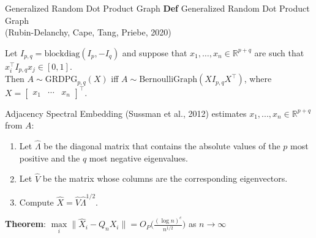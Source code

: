 \documentclass[
  ignorenonframetext,
]{beamer}
\providecommand{\tightlist}{%
  \setlength{\itemsep}{0pt}\setlength{\parskip}{0pt}}
\begin{document}
\begin{frame}{Generalized Random Dot Product Graph}
\protect\hypertarget{generalized-random-dot-product-graph}{}
\textbf{Def} Generalized Random Dot Product Graph\\
(Rubin-Delanchy, Cape, Tang, Priebe, 2020)

Let \(I_{p,q} = \text{blockdiag}(I_p, -I_q)\) and suppose that
\(x_1, \ldots, x_n \in \mathbb{R}^{p+q}\) are such that
\(x_i^\top I_{p,q} x_j \in [0,1]\).\\
Then \(A \sim \text{GRDPG}_{p, q}(X)\) iff
\(A \sim \text{BernoulliGraph}(X I_{p,q} X^\top)\), where
\(X = \begin{bmatrix} x_1 & \cdots & x_n \end{bmatrix}^\top\).

Adjacency Spectral Embedding (Sussman et al., 2012) estimates
\(x_1, ..., x_n \in \mathbb{R}^{p+q}\) from \(A\):

\begin{enumerate}
\tightlist
\item
  Let \(\hat{\Lambda}\) be the diagonal matrix that contains the
  absolute values of the \(p\) most positive and the \(q\) most negative
  eigenvalues.
\item
  Let \(\hat{V}\) be the matrix whose columns are the corresponding
  eigenvectors.
\item
  Compute \(\hat{X} = \hat{V} \hat{\Lambda}^{1/2}\).
\end{enumerate}

\textbf{Theorem}:
\(\max\limits_i \|\hat{X}_i - Q_n X_i \| = O_P \Big( \frac{(\log n)^c}{n^{1/2}} \Big)\)
as \(n \to \infty\)
\end{frame}
\end{document}
